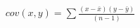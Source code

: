 \documentclass[10pt]{article}
\begin{document}
\begin{align*}cov(x,y) = \sum\frac{(x - \bar{x})(y-\bar{y})}{(n-1)}\end{align*}
\end{document}
